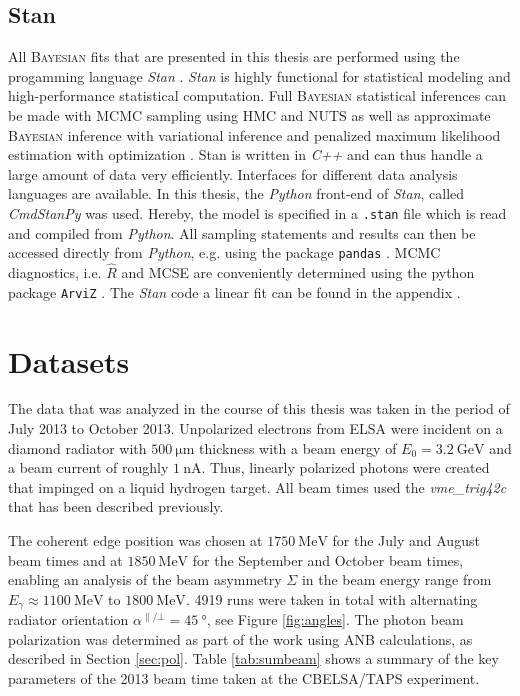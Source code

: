 \subsection{Stan}
All \textsc{Bayesian} fits that are presented in this thesis are performed using the progamming language \emph{Stan} \cite{stan}. \emph{Stan} is highly functional for statistical modeling and high-performance statistical computation. Full \textsc{Bayesian} statistical inferences can be made with MCMC sampling using HMC and NUTS as well as approximate \textsc{Bayesian} inference with variational inference and penalized maximum likelihood estimation with optimization \cite{stan}. Stan is written in \emph{C++} and can thus handle a large amount of data very efficiently. Interfaces for different data analysis languages are available. In this thesis, the \emph{Python} \cite{python} front-end of \emph{Stan}, called \emph{CmdStanPy} \cite{cmdstanpy} was used. Hereby, the model is specified in a \texttt{.stan} file which is read and compiled from \emph{Python}. All sampling statements and results can then be accessed directly from \emph{Python}, e.g. using the package \texttt{pandas} \cite{pandas}.  MCMC diagnostics, i.e. $\widehat{R}$ and MCSE are conveniently determined using the python package \texttt{ArviZ} \cite{arviz_2019}. The \emph{Stan} code a linear fit  can be found in the appendix \cite{app:soft}.
\section{Datasets}
The data that was analyzed in the course of this thesis was taken in the period of July 2013 to October 2013. Unpolarized electrons from ELSA were incident on a diamond radiator with $\SI{500}{\micro\meter}$ thickness with a beam energy of $E_0=\SI{3.2}{\giga\eV}$ and a beam current of roughly $\SI{1}{\nano\ampere}$. Thus, linearly polarized photons were created that impinged on a liquid hydrogen target. All beam times used the \emph{vme\_trig42c} that has been described previously.

The coherent edge position was chosen at $\SI{1750}{\mega\eV}$ for the July and August beam times and at $\SI{1850}{\mega\eV}$ for the September and October beam times, enabling an analysis of the beam asymmetry $\Sigma$ in the beam energy range from $E_\gamma\approx\SI{1100}{\mega\eV}$ to $\SI{1800}{\mega\eV}$.  4919 runs were taken in total  with alternating radiator orientation $\alpha^{\parallel/\bot}=\SI{45}{\degree}$, see Figure \ref{fig:angles}. The photon beam polarization was determined as part of the work \cite{farahphd} using ANB calculations, as described in Section \ref{sec:pol}. Table \ref{tab:sumbeam} shows a summary of the key parameters of the 2013 beam time taken at the CBELSA/TAPS experiment.

